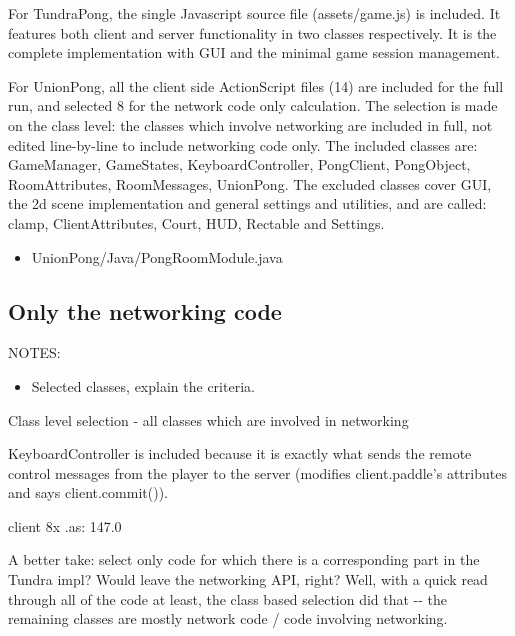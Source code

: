 \documentclass[conference]{IEEEtran}
\begin{document}
% 
% 
% 
% 
% 

For TundraPong, the single Javascript source file (assets/game.js) is
included. It features both client and server functionality in two
classes respectively. It is the complete implementation with GUI and
the minimal game session management.

For UnionPong, all the client side ActionScript files (14) are
included for the full run, and selected 8 for the network code only
calculation. The selection is made on the class level: the classes
which involve networking are included in full, not edited line-by-line
to include networking code only. The included classes are:
GameManager, GameStates, KeyboardController, PongClient, PongObject,
RoomAttributes, RoomMessages, UnionPong. The excluded classes cover
GUI, the 2d scene implementation and general settings and utilities,
and are called: clamp, ClientAttributes, Court, HUD, Rectable and
Settings.
%
\begin{itemize}

\item UnionPong/Java/PongRoomModule.java

\end{itemize}


\subsection{Only the networking code%
  \label{only-the-networking-code}%
}

NOTES:
%
\begin{itemize}

\item Selected classes, explain the criteria.

\end{itemize}

Class level selection - all classes which are involved in networking

KeyboardController is included because it is exactly what sends the
remote control messages from the player to the server (modifies
client.paddle's attributes and says client.commit()).

client 8x .as: 147.0

A better take: select only code for which there is a corresponding
part in the Tundra impl? Would leave the networking API, right? Well,
with a quick read through all of the code at least, the class based
selection did that -{}- the remaining classes are mostly network code /
code involving networking.
\end{document}
